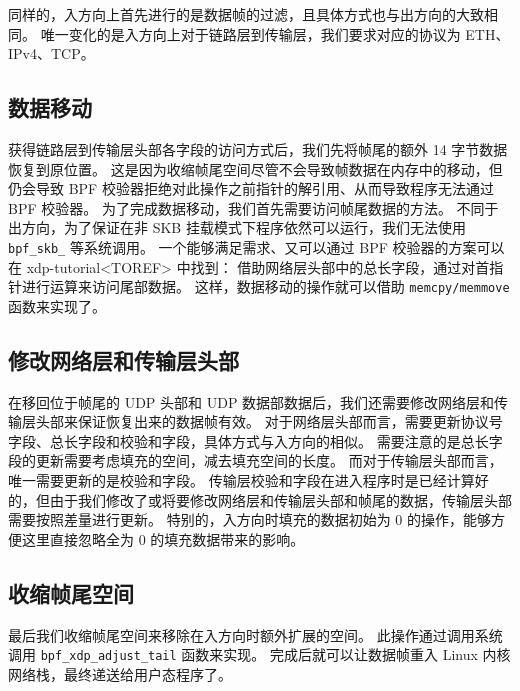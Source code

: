 同样的，入方向上首先进行的是数据帧的过滤，且具体方式也与出方向的大致相同。
唯一变化的是入方向上对于链路层到传输层，我们要求对应的协议为 ETH、IPv4、TCP。

\subsection{数据移动}

获得链路层到传输层头部各字段的访问方式后，我们先将帧尾的额外 14 字节数据恢复到原位置。
这是因为收缩帧尾空间尽管不会导致帧数据在内存中的移动，但仍会导致 BPF 校验器拒绝对此操作之前指针的解引用、从而导致程序无法通过 BPF 校验器。
为了完成数据移动，我们首先需要访问帧尾数据的方法。
不同于出方向，为了保证在非 SKB 挂载模式下程序依然可以运行，我们无法使用 \texttt{bpf\_skb\_\*} 等系统调用。
一个能够满足需求、又可以通过 BPF 校验器的方案可以在 xdp-tutorial<TOREF> 中找到：
借助网络层头部中的总长字段，通过对首指针进行运算来访问尾部数据。
这样，数据移动的操作就可以借助 \texttt{memcpy/memmove} 函数来实现了。

\subsection{修改网络层和传输层头部}

在移回位于帧尾的 UDP 头部和 UDP 数据部数据后，我们还需要修改网络层和传输层头部来保证恢复出来的数据帧有效。
对于网络层头部而言，需要更新协议号字段、总长字段和校验和字段，具体方式与入方向的相似。
需要注意的是总长字段的更新需要考虑填充的空间，减去填充空间的长度。
而对于传输层头部而言，唯一需要更新的是校验和字段。
传输层校验和字段在进入程序时是已经计算好的，但由于我们修改了或将要修改网络层和传输层头部和帧尾的数据，传输层头部需要按照差量进行更新。
特别的，入方向时填充的数据初始为 0 的操作，能够方便这里直接忽略全为 0 的填充数据带来的影响。

\subsection{收缩帧尾空间}

最后我们收缩帧尾空间来移除在入方向时额外扩展的空间。
此操作通过调用系统调用 \texttt{bpf\_xdp\_adjust\_tail} 函数来实现。
完成后就可以让数据帧重入 Linux 内核网络栈，最终递送给用户态程序了。
